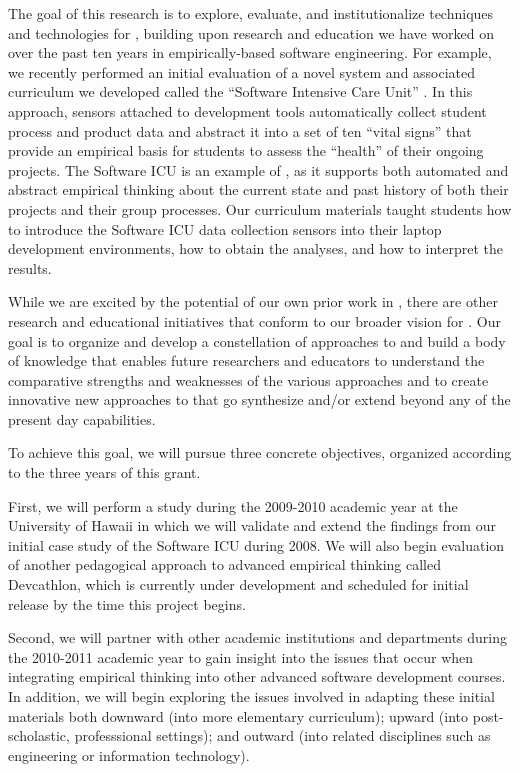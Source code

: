 The goal of this research is to explore, evaluate, and institutionalize
techniques and technologies for \eCT, building upon research and education
we have worked on over the past ten years in empirically-based software
engineering.  For example, we recently performed an initial evaluation of a
novel system and associated curriculum we developed called the ``Software
Intensive Care Unit'' \citep{csdl2-09-02}.  In this approach, sensors
attached to development tools automatically collect student process and
product data and abstract it into a set of ten ``vital signs'' that provide
an empirical basis for students to assess the ``health'' of their ongoing
projects.  The Software ICU is an example of \eCT, as it supports both
automated and abstract empirical thinking about the current state and past
history of both their projects and their group processes.  Our curriculum
materials taught students how to introduce the Software ICU data collection
sensors into their laptop development environments, how to obtain the
analyses, and how to interpret the results.

While we are excited by the potential of our own prior work in \eCT, there
are other research and educational initiatives that conform to our broader
vision for \eCT.  Our goal is to organize and develop a constellation of
approaches to \eCT and build a body of knowledge that enables future
researchers and educators to understand the comparative strengths and
weaknesses of the various approaches and to create innovative new
approaches to \eCT that go synthesize and/or extend beyond any of the
present day capabilities.

To achieve this goal, we will pursue three concrete objectives, organized
according to the three years of this grant.  

First, we will perform a study during the 2009-2010 academic year at the
University of Hawaii in which we will validate and extend the findings from
our initial case study of the Software ICU during 2008.  We will also begin
evaluation of another pedagogical approach to advanced empirical thinking
called Devcathlon, which is currently under development and scheduled for
initial release by the time this project begins.

Second, we will partner with other academic institutions and departments
during the 2010-2011 academic year to gain insight into the issues that
occur when integrating empirical thinking into other advanced software
development courses.  In addition, we will begin exploring the issues
involved in adapting these initial materials both downward (into more
elementary curriculum); upward (into post-scholastic, professsional
settings); and outward (into related disciplines such as engineering or
information technology).

